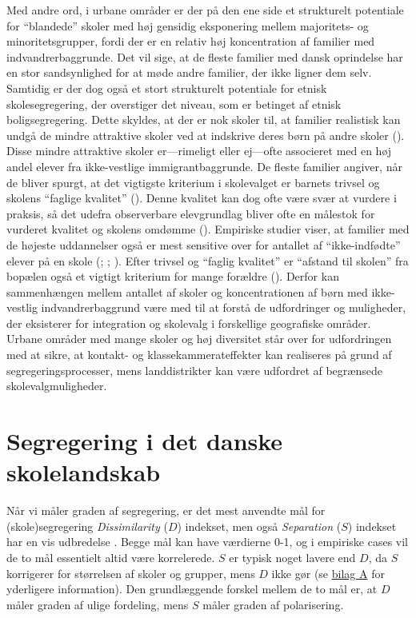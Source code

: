 \documentclass[
]{book}
\begin{document}
Med andre ord, i urbane områder er der på den ene side et strukturelt potentiale for ``blandede'' skoler med høj gensidig eksponering mellem majoritets- og minoritetsgrupper, fordi der er en relativ høj koncentration af familier med indvandrerbaggrunde. Det vil sige, at de fleste familier med dansk oprindelse har en stor sandsynlighed for at møde andre familier, der ikke ligner dem selv. Samtidig er der dog også et stort strukturelt potentiale for etnisk skolesegregering, der overstiger det niveau, som er betinget af etnisk boligsegregering. Dette skyldes, at der er nok skoler til, at familier realistisk kan undgå de mindre attraktive skoler ved at indskrive deres børn på andre skoler (). Disse mindre attraktive skoler er---rimeligt eller ej---ofte associeret med en høj andel elever fra ikke-vestlige immigrantbaggrunde. De fleste familier angiver, når de bliver spurgt, at det vigtigste kriterium i skolevalget er barnets trivsel og skolens ``faglige kvalitet'' (). Denne kvalitet kan dog ofte være svær at vurdere i praksis, så det udefra observerbare elevgrundlag bliver ofte en målestok for vurderet kvalitet og skolens omdømme (). Empiriske studier viser, at familier med de højeste uddannelser også er mest sensitive over for antallet af ``ikke-indfødte'' elever på en skole (; ; ). Efter trivsel og ``faglig kvalitet'' er ``afstand til skolen'' fra bopælen også et vigtigt kriterium for mange forældre (). Derfor kan sammenhængen mellem antallet af skoler og koncentrationen af børn med ikke-vestlig indvandrerbaggrund være med til at forstå de udfordringer og muligheder, der eksisterer for integration og skolevalg i forskellige geografiske områder. Urbane områder med mange skoler og høj diversitet står over for udfordringen med at sikre, at kontakt- og klassekammerateffekter kan realiseres på grund af segregeringsprocesser, mens landdistrikter kan være udfordret af begrænsede skolevalgmuligheder.

\section{Segregering i det danske skolelandskab}\label{segregering-i-det-danske-skolelandskab}

Når vi måler graden af segregering, er det mest anvendte mål for (skole)segregering \emph{Dissimilarity} (\(D\)) indekset, men også \emph{Separation} (\(S\)) indekset har en vis udbredelse . Begge mål kan have værdierne 0-1, og i empiriske cases vil de to mål essentielt altid være korrelerede. \(S\) er typisk noget lavere end \(D\), da \(S\) korrigerer for størrelsen af skoler og grupper, mens \(D\) ikke gør (se \hyperref[bilag1]{bilag A} for yderligere information). Den grundlæggende forskel mellem de to mål er, at \(D\) måler graden af ulige fordeling, mens \(S\) måler graden af polarisering.
\end{document}
